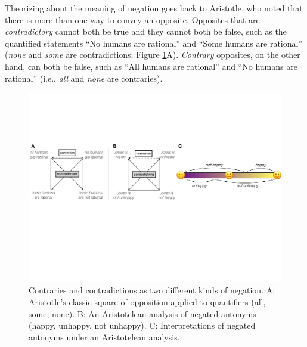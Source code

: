 \documentclass[floatsintext,doc]{apa6}
\begin{document}
Theorizing about the meaning of negation goes back to Aristotle, who noted that there is more than one way to convey an opposite.
Opposites that are \emph{contradictory} cannot both be true and they cannot both be false, such as the quantified statements \enquote{No humans are rational} and \enquote{Some humans are rational}  (\emph{none} and \emph{some} are contradictions; Figure \ref{fig:opp-square}A). 
\emph{Contrary} opposites, on the other hand, can both be false, such as \enquote{All humans are rational} and \enquote{No humans are rational} (i.e., \emph{all} and \emph{none} are contraries). 


\begin{figure}[t]
\center \includegraphics[width=1\textwidth]{figs/opp-square2}  
\caption{Contraries and contradictions as two different kinds of negation. A: Aristotle's classic square of opposition applied to quantifiers (all, some, none). B: An Aristotelean analysis of negated antonyms (happy, unhappy, not unhappy). C: Interpretations of negated antonyms under an Aristotelean analysis.}\label{fig:opp-square}
\end{figure}
\end{document}
